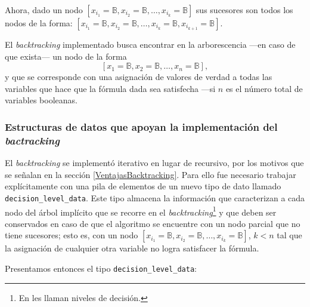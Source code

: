 \documentclass[12pt,lettersize]{article}
\begin{document}
Ahora, dado un nodo $[x_{i_1}=\mathbb{B},x_{i_2}=\mathbb{B},\ldots, x_{i_k} =
\mathbb{B} ]$ sus sucesores son todos los nodos de la forma:
$[x_{i_1}=\mathbb{B},x_{i_2}=\mathbb{B},\ldots, x_{i_k} = \mathbb{B},
x_{i_{k+1}}=\mathbb{B} ]$.

El \emph{backtracking} implementado busca encontrar en la arborescencia ---en
caso de que exista--- un nodo de la forma
\[[x_{1}=\mathbb{B},x_{2}=\mathbb{B},\ldots, x_{n} = \mathbb{B} ], \] y que se
corresponde con una asignación de valores de verdad a todas las variables que
hace que la fórmula dada sea satisfecha ---si $n$ es el número total de
variables booleanas.
\vspace{-2.5mm}

\subsubsection{Estructuras de datos que apoyan la implementación del \emph{bactracking}}
El \emph{backtracking} se implementó iterativo en lugar de recursivo, por los
motivos que se señalan en la sección \ref{VentajasBacktracking}. Para ello fue
necesario trabajar explícitamente con una pila de elementos de un nuevo tipo de
dato llamado {\tt decision\_level\_data}. Este tipo almacena la información que
caracterizan a cada nodo del árbol implícito que se recorre en el
\emph{backtracking}\footnote{En \cite{Zhang} les llaman niveles de decisión.} y
que deben ser conservados en caso de que el algoritmo se encuentre con un nodo
parcial que no tiene sucesores; esto es, con un nodo
$[x_{i_1}=\mathbb{B},x_{i_2}=\mathbb{B},\ldots, x_{i_k} = \mathbb{B} ]$, $k< n$
tal que la asignación de cualquier otra variable no logra satisfacer la fórmula.

Presentamos entonces el tipo {\tt decision\_level\_data}:
\end{document}

